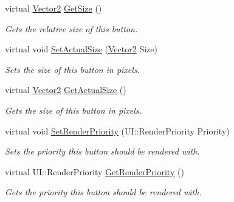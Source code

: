 \begin{DoxyCompactItemize}
virtual \hyperlink{classphys_1_1Vector2}{Vector2} \hyperlink{classphys_1_1UI_1_1Button_ade75e042d1a19be5d4fb1b16913af5a5}{GetSize} ()
\begin{DoxyCompactList}\small\item\em Gets the relative size of this button. \item\end{DoxyCompactList}\item 
virtual void \hyperlink{classphys_1_1UI_1_1Button_a4075f879a67726b80c18d3bc647e12fe}{SetActualSize} (\hyperlink{classphys_1_1Vector2}{Vector2} Size)
\begin{DoxyCompactList}\small\item\em Sets the size of this button in pixels. \item\end{DoxyCompactList}\item 
virtual \hyperlink{classphys_1_1Vector2}{Vector2} \hyperlink{classphys_1_1UI_1_1Button_ab6640af433afe96d5f6bd7016986d73f}{GetActualSize} ()
\begin{DoxyCompactList}\small\item\em Gets the size of this button in pixels. \item\end{DoxyCompactList}\item 
virtual void \hyperlink{classphys_1_1UI_1_1Button_a569053caa70448d560fd016d86ef52cb}{SetRenderPriority} (UI::RenderPriority Priority)
\begin{DoxyCompactList}\small\item\em Sets the priority this button should be rendered with. \item\end{DoxyCompactList}\item 
virtual UI::RenderPriority \hyperlink{classphys_1_1UI_1_1Button_aa17ffbc9b0d4eed151ff5ecbf93d88b8}{GetRenderPriority} ()
\begin{DoxyCompactList}\small\item\em Gets the priority this button should be rendered with. \item\end{DoxyCompactList}\end{DoxyCompactItemize}
